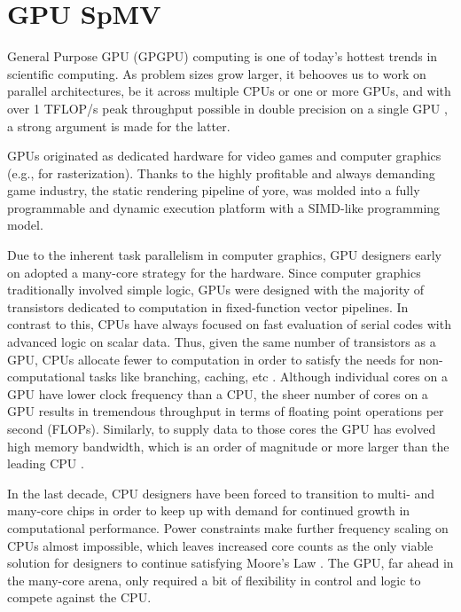 \documentclass{report}
\begin{document}
\fi

\chapter{GPU SpMV}
\label{chap:gpu_rbffd}

General Purpose GPU (GPGPU) computing is one of today's hottest trends in scientific computing. As problem sizes grow larger, it behooves us to work on parallel architectures, be it across multiple CPUs or one or more GPUs, and with over 1 TFLOP/s peak throughput possible in double precision on a single GPU \cite{KeplerFactSheet}, a strong argument is made for the latter. 

GPUs originated as dedicated hardware for video games and computer graphics (e.g., for rasterization). Thanks to the highly profitable and always demanding game industry, the static rendering pipeline of yore, was molded into a fully programmable and dynamic execution platform with a SIMD-like programming model. 


Due to the inherent task parallelism in computer graphics, GPU designers early on adopted a many-core strategy for the hardware. Since computer graphics traditionally involved simple logic, GPUs were designed with the majority of transistors dedicated to computation in fixed-function vector pipelines. In contrast to this, CPUs have always focused on fast evaluation of serial codes with advanced logic on scalar data. Thus, given the same number of transistors as a GPU, CPUs allocate fewer to computation in order to satisfy the needs for non-computational tasks like branching, caching, etc \cite{Owens2007,CudaGuide2011}. Although individual cores on a GPU have lower clock frequency than a CPU, the sheer number of cores on a GPU results in tremendous throughput in terms of floating point operations per second (FLOPs). Similarly, to supply data to those cores the GPU has evolved high memory bandwidth, which is an order of magnitude or more larger than the leading CPU \cite{CudaGuide2011}. 


In the last decade, CPU designers have been forced to transition to multi- and many-core chips in order to keep up with demand for continued growth in computational performance. Power constraints make further frequency scaling on CPUs almost impossible, which leaves increased core counts as the only viable solution for designers to continue satisfying Moore's Law \cite{Owens2007}. The GPU, far ahead in the many-core arena, only required a bit of flexibility in control and logic to compete against the CPU. 
\end{document}
